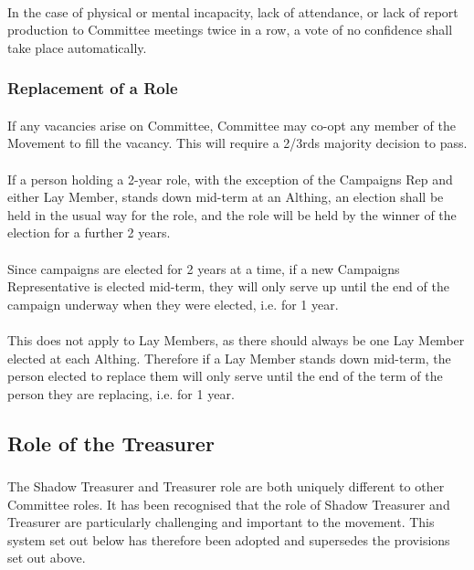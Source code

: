 \documentclass[a4paper, 12pt]{report}
\begin{document}
\paragraph{} In the case of physical or mental incapacity, lack of attendance, or lack of report production to Committee meetings twice in a row, a vote of no confidence shall take place automatically.
\subsubsection{Replacement of a Role}
\label{sec:rolereplacement}
\paragraph{} If any vacancies arise on Committee, Committee may co-opt any member of the Movement to fill the vacancy. This will require a 2/3rds majority decision to pass.
\paragraph{} If a person holding a 2-year role, with the exception of the Campaigns Rep and either Lay Member, stands down mid-term at an Althing, an election shall be held in the usual way for the role, and the role will be held by the winner of the election for a further 2 years.
\paragraph{} Since campaigns are elected for 2 years at a time, if a new Campaigns Representative is elected mid-term, they will only serve up until the end of the campaign underway when they were elected, i.e. for 1 year.
\paragraph{} This does not apply to Lay Members, as there should always be one Lay Member elected at each Althing. Therefore if a Lay Member stands down mid-term, the person elected to replace them will only serve until the end of the term of the person they are replacing, i.e. for 1 year.

\subsection{Role of the Treasurer}
\label{sec:treasurerrole}
\subsubsection{}
The Shadow Treasurer and Treasurer role are both uniquely different to other Committee roles. It has been recognised that the role of Shadow Treasurer and Treasurer are particularly challenging and important to the movement. This system set out below has therefore been adopted and supersedes the provisions set out above.
\end{document}
